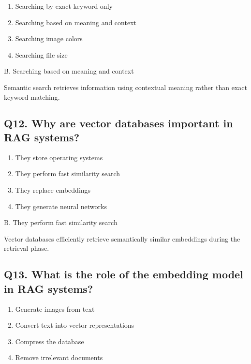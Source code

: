 \documentclass[12pt,a4paper]{article}
\begin{document}
\begin{enumerate}[label=\Alph*.]
\item Searching by exact keyword only
\item Searching based on meaning and context
\item Searching image colors
\item Searching file size
\end{enumerate}

\begin{tcolorbox}[colback=mid,colframe=softblue,title=Correct Answer]
B. Searching based on meaning and context

Semantic search retrieves information using contextual meaning rather than exact keyword matching.
\end{tcolorbox}


\subsection*{Q12. Why are vector databases important in RAG systems?}

\begin{enumerate}[label=\Alph*.]
\item They store operating systems
\item They perform fast similarity search
\item They replace embeddings
\item They generate neural networks
\end{enumerate}

\begin{tcolorbox}[colback=mid,colframe=softblue,title=Correct Answer]
B. They perform fast similarity search

Vector databases efficiently retrieve semantically similar embeddings during the retrieval phase.
\end{tcolorbox}

\subsection*{Q13. What is the role of the embedding model in RAG systems?}

\begin{enumerate}[label=\Alph*.]
\item Generate images from text
\item Convert text into vector representations
\item Compress the database
\item Remove irrelevant documents
\end{enumerate}
\end{document}
